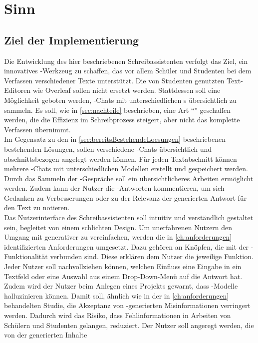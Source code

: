 \documentclass[../main.tex]{subfiles}
\begin{document}
\section{Sinn}

\subsection{Ziel der Implementierung}


Die Entwicklung des hier beschriebenen Schreibassistenten verfolgt das Ziel, ein innovatives -Werkzeug zu schaffen, das vor allem Schüler und Studenten bei dem Verfassen 
verschiedener Texte unterstützt. Die von Studenten genutzten Text-Editoren wie Overleaf sollen nicht ersetzt werden. Stattdessen soll eine Möglichkeit geboten werden, 
-Chats mit unterschiedlichen s übersichtlich zu sammeln. Es soll, wie in \autoref{sec:nachteile} beschrieben, eine Art "`"' geschaffen werden, die die Effizienz im Schreibprozess 
steigert, aber nicht das komplette Verfassen übernimmt.\\ Im Gegensatz zu den in \autoref{sec:bereitsBestehendeLoesungen} beschriebenen bestehenden Lösungen, sollen verschiedene -Chats 
übersichtlich und abschnittsbezogen angelegt werden können. Für jeden Textabschnitt können mehrere -Chats mit unterschiedlichen Modellen erstellt und gespeichert werden. Durch das Sammeln der -Gespräche soll ein übersichtlicheres Arbeiten ermöglicht werden. Zudem kann der Nutzer die -Antworten kommentieren, um sich Gedanken zu Verbesserungen oder zu der Relevanz der generierten Antwort für den Text zu notieren.\\
Das Nutzerinterface des Schreibassistenten soll intuitiv und verständlich gestaltet sein, begleitet von einem schlichten Design. Um unerfahrenen Nutzern den Umgang mit 
generativer  zu vereinfachen, werden die in \autoref{ch:anforderungen} identifizierten Anforderungen umgesetzt. Dazu gehören  an Knöpfen, die mit der 
-Funktionalität verbunden sind. Diese erklären dem Nutzer die jeweilige Funktion. Jeder Nutzer soll nachvollziehen können, welchen Einfluss eine Eingabe in 
ein Textfeld oder eine Auswahl aus einem Drop-Down-Menü auf die Antwort hat. Zudem wird der Nutzer beim Anlegen eines Projekts gewarnt, dass 
-Modelle halluzinieren können. Damit soll, ähnlich wie in der in \autoref{ch:anforderungen} behandelten Studie, die Akzeptanz von -generierten Misinformationen verringert werden. Dadurch 
wird das Risiko, dass Fehlinformationen in Arbeiten von Schülern und Studenten gelangen, reduziert. Der Nutzer soll angeregt werden, die von der  generierten Inhalte 
\end{document}
